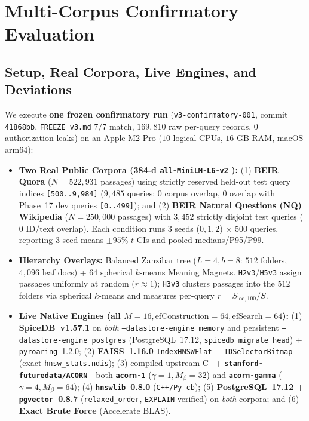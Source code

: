 \documentclass[conference]{IEEEtran}
\begin{document}
\section{Multi-Corpus Confirmatory Evaluation}
\label{sec:evaluation}

\subsection{Setup, Real Corpora, Live Engines, and Deviations}
\label{sec:setup}

We execute \textbf{one frozen confirmatory run} (\texttt{v3-confirmatory-001}, commit \texttt{41868bb}, \texttt{FREEZE\_v3.md} $7/7$ match, $169{,}810$ raw per-query records, $0$ authorization leaks) on an Apple M2 Pro ($10$ logical CPUs, $16\text{ GB}$ RAM, macOS arm64):
\begin{itemize}
    \item \textbf{Two Real Public Corpora (384-d \texttt{all-MiniLM-L6-v2} \cite{reimers2019sentencebert}):} (1) \textbf{BEIR Quora} \cite{thakur2021beir} ($N=522{,}931$ passages) using strictly reserved held-out test query indices \texttt{[500..9,984]} ($9{,}485$ queries; $0$ corpus overlap, $0$ overlap with Phase~17 dev queries \texttt{[0..499]}); and (2) \textbf{BEIR Natural Questions (NQ) Wikipedia} ($N=250{,}000$ passages) with $3{,}452$ strictly disjoint test queries ($0$ ID/text overlap). Each condition runs $3$ seeds ($0, 1, 2$) $\times$ $500$ queries, reporting 3-seed means $\pm 95\%$ $t$-CIs and pooled medians/P95/P99.
    \item \textbf{Hierarchy Overlays:} Balanced Zanzibar tree ($L=4, b=8$: $512$ folders, $4{,}096$ leaf docs) + $64$ spherical $k$-means Meaning Magnets. \texttt{H2v3}/\texttt{H5v3} assign passages uniformly at random ($r \approx 1$); \texttt{H3v3} clusters passages into the $512$ folders via spherical $k$-means and measures per-query $r = S_{\text{loc},100}/S$.
    \item \textbf{Live Native Engines (all $M=16, \text{efConstruction}=64, \text{efSearch}=64$):} (1) \textbf{SpiceDB~v1.57.1} on \textit{both} \texttt{--datastore-engine memory} and persistent \texttt{--datastore-engine postgres} (PostgreSQL~17.12, \texttt{spicedb migrate head}) + \texttt{pyroaring}~1.2.0; (2) \textbf{FAISS~1.16.0} \texttt{IndexHNSWFlat} + \texttt{IDSelectorBitmap} (exact \texttt{hnsw\_stats.ndis}); (3) compiled upstream C++ \textbf{\texttt{stanford-futuredata/ACORN}}---both \textbf{\texttt{acorn-1}} ($\gamma=1, M_\beta=32$) and \textbf{\texttt{acorn-gamma}} ($\gamma=4, M_\beta=64$); (4) \textbf{\texttt{hnswlib}~0.8.0} (\texttt{C++/Py-cb}); (5) \textbf{PostgreSQL~17.12 + \texttt{pgvector}~0.8.7} (\texttt{relaxed\_order}, \texttt{EXPLAIN}-verified) on \textit{both} corpora; and (6) \textbf{Exact Brute Force} (Accelerate BLAS).

\end{itemize}
\end{document}
